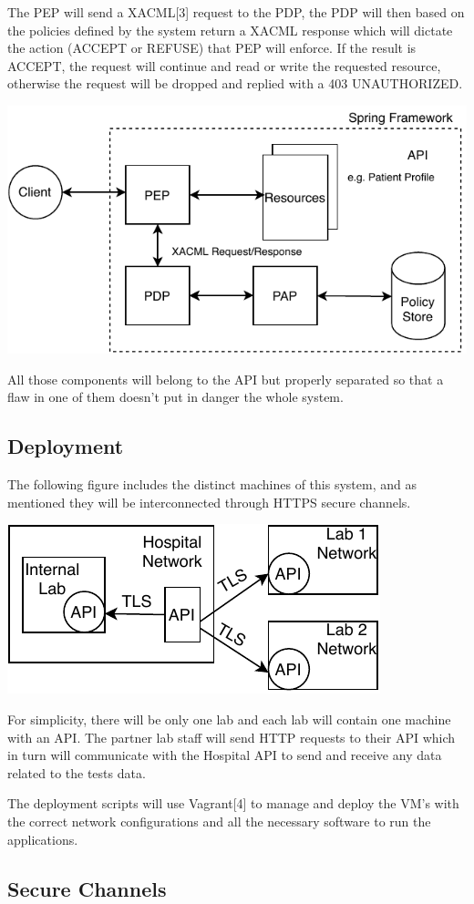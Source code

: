 The PEP will send a XACML[3] request to the PDP, the PDP will then based on the policies defined by the system return a XACML response which will dictate the action (ACCEPT or REFUSE) that PEP will enforce. If the result is ACCEPT, the request will continue and read or write the requested resource, otherwise the request will be dropped and replied with a 403 UNAUTHORIZED.

	\includegraphics[width=.6\textwidth]{figs/access_control.pdf}


All those components will belong to the API but properly separated so that a flaw in one of them doesn't put in danger the whole system.

\subsection{Deployment}
The following figure includes the distinct machines of this system, and as mentioned they will be interconnected through HTTPS secure channels.

	\includegraphics[width=.4\textwidth]{figs/infrastructure.pdf}

For simplicity, there will be only one lab and each lab will contain one machine with an API. The partner lab staff will send HTTP requests to their API which in turn will communicate with the Hospital API to send and receive any data related to the tests data.

The deployment scripts will use Vagrant[4] to manage and deploy the VM's with the correct network configurations and all the necessary software to run the applications. \\

\subsection{Secure Channels}

